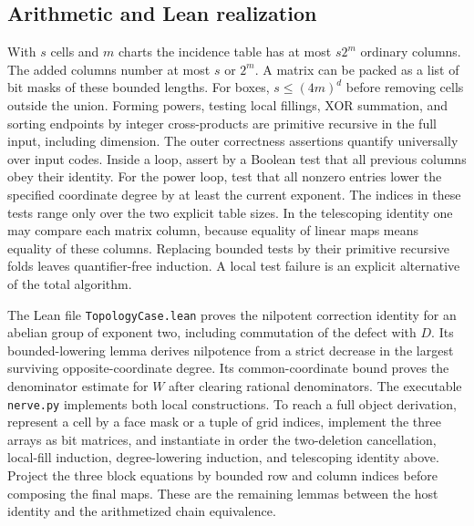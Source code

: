 

\subsection{Arithmetic and Lean realization}

With $s$ cells and $m$ charts the incidence table has at most $s2^m$
ordinary columns. The added columns number at most $s$ or $2^m$.
A matrix can be packed as a list of bit masks of these bounded lengths.
For boxes, $s\le (4m)^d$ before removing cells outside the union.
Forming powers, testing local fillings, XOR summation, and sorting endpoints
by integer cross-products are primitive recursive in the full input,
including dimension. The outer correctness assertions quantify universally
over input codes. Inside a loop, assert by a Boolean test that all
previous columns obey their identity. For the power loop, test that all
nonzero entries lower the specified coordinate degree by at least the
current exponent. The indices in these tests range only over the two
explicit table sizes. In the telescoping identity one may compare each
matrix column, because equality of linear maps means equality of these
columns. Replacing bounded tests by their primitive recursive folds leaves
quantifier-free induction. A local test failure is an explicit alternative
of the total algorithm.

The Lean file \texttt{TopologyCase.lean} proves the nilpotent correction
identity for an abelian group of exponent two, including commutation of the
defect with $D$. Its bounded-lowering lemma derives nilpotence from a
strict decrease in the largest surviving opposite-coordinate degree. Its
common-coordinate bound proves the denominator estimate for $W$ after
clearing rational denominators. The executable \texttt{nerve.py} implements both local
constructions. To reach a full object derivation, represent a cell by a face
mask or a tuple of grid indices, implement the three arrays as bit matrices,
and instantiate in order the two-deletion cancellation, local-fill
induction, degree-lowering induction, and telescoping identity above.
Project the three block equations by bounded row and column indices before
composing the final maps. These are the remaining lemmas between the host
identity and the arithmetized chain equivalence.
